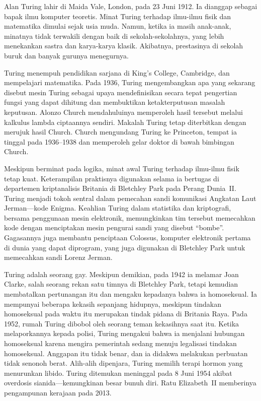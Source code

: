 \documentclass[../../../include/open-logic-section]{subfiles}
\begin{document}


Alan Turing lahir di Maida Vale, London, pada 23 Juni 1912. Ia dianggap
sebagai bapak ilmu komputer teoretis. Minat Turing terhadap ilmu-ilmu fisik
dan matematika dimulai sejak usia muda. Namun, ketika ia masih anak-anak,
minatnya tidak terwakili dengan baik di sekolah-sekolahnya, yang lebih
menekankan sastra dan karya-karya klasik. Akibatnya, prestasinya di sekolah
buruk dan banyak gurunya menegurnya.


Turing menempuh pendidikan sarjana di King's College, Cambridge, dan
mempelajari matematika. Pada 1936, Turing mengembangkan apa yang sekarang
disebut mesin Turing sebagai upaya mendefinisikan secara tepat pengertian
fungsi yang dapat dihitung dan membuktikan ketakterputusan masalah
keputusan. Alonzo Church mendahuluinya memperoleh hasil tersebut melalui
kalkulus lambda ciptaannya sendiri. Makalah Turing tetap diterbitkan dengan
merujuk hasil Church. Church mengundang Turing ke Princeton, tempat ia
tinggal pada 1936--1938 dan memperoleh gelar doktor di bawah bimbingan
Church.

Meskipun berminat pada logika, minat awal Turing terhadap ilmu-ilmu fisik
tetap kuat. Keterampilan praktisnya digunakan selama ia bertugas di
departemen kriptanalisis Britania di Bletchley Park pada Perang Dunia~II\@.
Turing menjadi tokoh sentral dalam pemecahan sandi komunikasi Angkatan Laut
Jerman---kode Enigma. Keahlian Turing dalam statistika dan kriptografi,
bersama penggunaan mesin elektronik, memungkinkan tim tersebut memecahkan
kode dengan menciptakan mesin pengurai sandi yang disebut ``bombe''.
Gagasannya juga membantu penciptaan Colossus, komputer elektronik pertama
di dunia yang dapat diprogram, yang juga digunakan di Bletchley Park untuk memecahkan
sandi Lorenz Jerman.

Turing adalah seorang gay. Meskipun demikian, pada 1942 ia melamar Joan Clarke,
salah seorang rekan satu timnya di Bletchley Park, tetapi kemudian
membatalkan pertunangan itu dan mengaku kepadanya bahwa ia homoseksual. Ia
mempunyai beberapa kekasih sepanjang hidupnya, meskipun tindakan homoseksual
pada waktu itu merupakan tindak pidana di Britania Raya. Pada 1952, rumah
Turing dibobol oleh seorang teman kekasihnya saat itu. Ketika melaporkannya
kepada polisi, Turing mengakui bahwa ia menjalani hubungan homoseksual
karena mengira pemerintah sedang menuju legalisasi tindakan homoseksual.
Anggapan itu tidak benar, dan ia didakwa melakukan perbuatan tidak senonoh
berat. Alih-alih dipenjara, Turing memilih terapi hormon yang menurunkan
libido. Turing ditemukan meninggal pada 8 Juni 1954 akibat overdosis
sianida---kemungkinan besar bunuh diri. Ratu Elizabeth~II memberinya
pengampunan kerajaan pada 2013.
\end{document}
